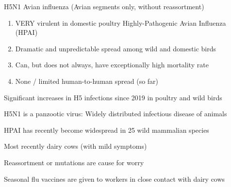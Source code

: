 \documentclass{notes}
\begin{document}
H5N1 Avian influenza (Avian segments only, without reassortment)

\begin{enumerate}
    \item VERY virulent in domestic poultry
    \subitem Highly-Pathogenic Avian Influenza (HPAI)
    \item Dramatic and unpredictable spread among wild and domestic birds
    \item Can, but does not always, have exceptionally high mortality rate
    \item None / limited human-to-human spread (so far)
\end{enumerate}

Significant increases in H5 infections since 2019 in poultry and wild birds

\tab H5N1 is a panzootic virus: Widely distributed infectious disease of animals

HPAI has recently become widespread in 25 wild mammalian species

\tab Most recently dairy cows (with mild symptoms)

\tab Reassortment or mutations are cause for worry

\tab \indicates Seasonal flu vaccines are given to workers in close contact with dairy cows
\end{document}

